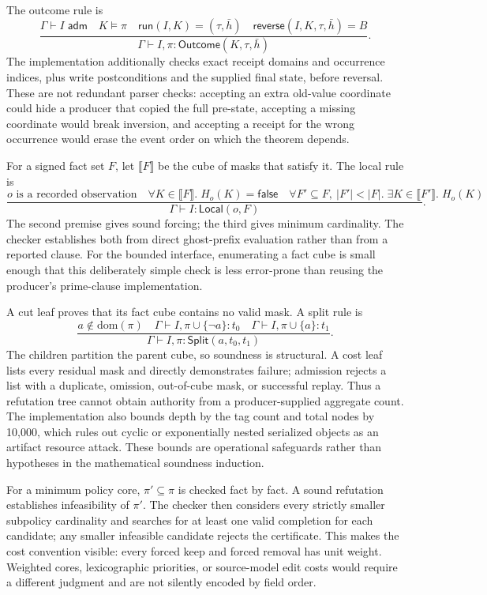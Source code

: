 The outcome rule is
\[
\frac{
 \Gamma\vdash I\;\mathsf{adm}
 \quad K\models\pi
 \quad \mathsf{run}(I,K)=(\tau,\bar h)
 \quad \mathsf{reverse}(I,K,\tau,\bar h)=B
}{
 \Gamma\vdash I,\pi:\mathsf{Outcome}(K,\tau,\bar h)
}.
\]
The implementation additionally checks exact receipt domains and occurrence indices, plus write postconditions and the supplied final state, before reversal.  These are
not redundant parser checks: accepting an extra old-value coordinate could hide a
producer that copied the full pre-state, accepting a missing coordinate would break
inversion, and accepting a receipt for the wrong occurrence would erase the event
order on which the theorem depends.

For a signed fact set $F$, let $\llbracket F\rrbracket$ be the cube of masks that
satisfy it.  The local rule is
\[
\frac{
 o\text{ is a recorded observation}
 \quad \forall K\in\llbracket F\rrbracket.\;H_o(K)=\mathsf{false}
 \quad \forall F'\subseteq F,\ |F'|<|F|.\;\exists K\in\llbracket F'\rrbracket.\;H_o(K)
}{
 \Gamma\vdash I:\mathsf{Local}(o,F)
}.
\]
The second premise gives sound forcing; the third gives minimum cardinality.  The
checker establishes both from direct ghost-prefix evaluation rather than from a
reported clause.  For the bounded interface, enumerating a fact cube is small enough
that this deliberately simple check is less error-prone than reusing the producer's
prime-clause implementation.

A cut leaf proves that its fact cube contains no valid mask.  A split rule is
\[
\frac{
 a\notin\mathrm{dom}(\pi)
 \quad \Gamma\vdash I,\pi\cup\{\neg a\}:t_0
 \quad \Gamma\vdash I,\pi\cup\{a\}:t_1
}{
 \Gamma\vdash I,\pi:\mathsf{Split}(a,t_0,t_1)
}.
\]
The children partition the parent cube, so soundness is structural.  A cost leaf
lists every residual mask and directly demonstrates failure; admission rejects a
list with a duplicate, omission, out-of-cube mask, or successful replay.  Thus a
refutation tree cannot obtain authority from a producer-supplied aggregate count.
The implementation also bounds depth by the tag count and total nodes by 10,000,
which rules out cyclic or exponentially nested serialized objects as an artifact
resource attack.  These bounds are operational safeguards rather than hypotheses in
the mathematical soundness induction.

For a minimum policy core, $\pi'\subseteq\pi$ is checked fact by fact.  A sound
refutation establishes infeasibility of $\pi'$.  The checker then considers every
strictly smaller subpolicy cardinality and searches for at least one valid completion
for each candidate; any smaller infeasible candidate rejects the certificate.  This
makes the cost convention visible: every forced keep and forced removal has unit
weight.  Weighted cores, lexicographic priorities, or source-model edit costs would
require a different judgment and are not silently encoded by field order.

